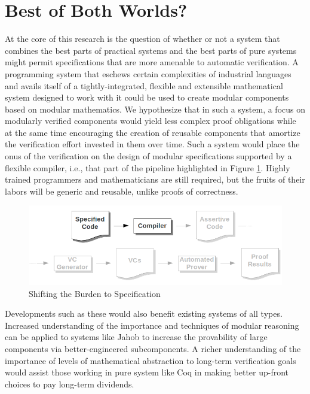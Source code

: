 \section{Best of Both Worlds?}
At the core of this research is the question of whether or not a system that combines the best parts of practical systems and the best parts of pure systems might permit specifications that are more amenable to automatic verification.  A programming system that eschews certain complexities of industrial languages and avails itself of a tightly-integrated, flexible and extensible mathematical system designed to work with it could be used to create modular components based on modular mathematics.  We hypothesize that in such a system, a focus on modularly verified components would yield less complex proof obligations while at the same time encouraging the creation of reusable components that amortize the verification effort invested in them over time.  Such a system would place the onus of the verification on the design of modular specifications supported by a flexible compiler, i.e., that part of the pipeline highlighted in Figure \ref{fig:specification}.  Highly trained programmers and mathematicians are still required, but the fruits of their labors will be generic and reusable, unlike proofs of correctness.

\begin{figure}
  \centering
    \includegraphics[width=\textwidth]{specpart}
  \caption{Shifting the Burden to Specification\label{fig:specification}}
\end{figure}

Developments such as these would also benefit existing systems of all types.  Increased understanding of the importance and techniques of modular reasoning can be applied to systems like Jahob to increase the provability of large components via better-engineered subcomponents.  A richer understanding of the importance of levels of mathematical abstraction to long-term verification goals would assist those working in pure system like Coq in making better up-front choices to pay long-term dividends.

